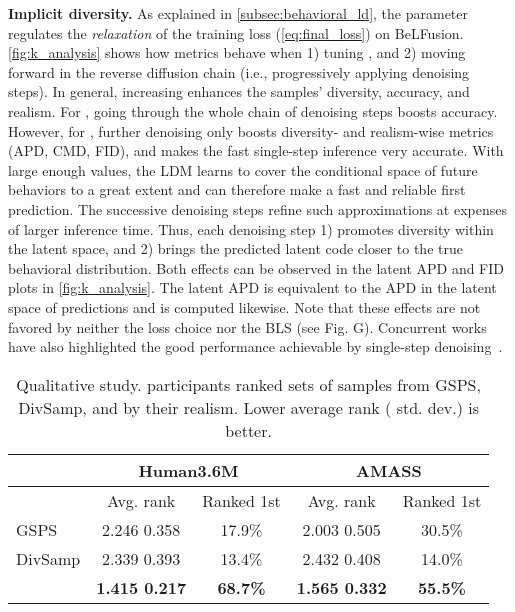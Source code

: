 \documentclass[10pt,twocolumn,letterpaper]{article}
\begin{document}
\textbf{Implicit diversity.} As explained in \autoref{subsec:behavioral_ld}, the parameter  regulates the \textit{relaxation} of the training loss (\autoref{eq:final_loss}) on BeLFusion. \autoref{fig:k_analysis} shows how metrics behave when 1) tuning , and 2) moving forward in the reverse diffusion chain (i.e., progressively applying denoising steps). In general, increasing  enhances the samples' diversity, accuracy, and realism. For , going through the whole chain of denoising steps boosts accuracy. However, for , further denoising only boosts diversity- and realism-wise metrics (APD, CMD, FID), and makes the fast single-step inference very accurate. With large enough  values, the LDM learns to cover the conditional space of future behaviors to a great extent and can therefore make a fast and reliable first prediction. The successive denoising steps refine such approximations at expenses of larger inference time. Thus, each denoising step 1) promotes diversity within the latent space, and 2) brings the predicted latent code closer to the true behavioral distribution. Both effects can be observed in the latent APD and FID plots in \autoref{fig:k_analysis}. The latent APD is equivalent to the APD in the latent space of predictions and is computed likewise. 
Note that these effects are not favored by neither the loss choice nor the BLS (see \supp{} Fig. G). Concurrent works have also highlighted the good performance achievable by single-step denoising~\cite{bansal2022colddiff, chen2022diffusiondet}.



\setlength{\tabcolsep}{3pt}
\begin{table}[t!]\renewcommand{\arraystretch}{0.9}
    \footnotesize
    \centering
    \begin{tabular}{l@{\hskip 4mm}cccc}
        \toprule
        & \multicolumn{2}{c}{Human3.6M\cite{ionescu2013h36m}} & \multicolumn{2}{c}{AMASS\cite{mahmood2019amass}} \\
        \midrule
        & Avg. rank & Ranked 1st & Avg. rank & Ranked 1st \\
        \midrule
        GSPS & 2.246  0.358 & 17.9\% & 2.003  0.505 & 30.5\% \\
        DivSamp & 2.339  0.393 & 13.4\% & 2.432  0.408 & 14.0\% \\
        \modelname{} & \textbf{1.415  0.217} & \textbf{68.7\%} & \textbf{1.565  0.332} & \textbf{55.5\%} \\
        \bottomrule
    \end{tabular}
    \vspace{-0.1cm}
    \caption{Qualitative study. \participants{} participants ranked sets of samples from GSPS, DivSamp, and \modelname{} by their realism. Lower average rank ( std. dev.) is better.}
    \label{tab:mos_results}\vspace{-0.5cm}
\end{table}
\setlength{\tabcolsep}{6pt}
\end{document}
